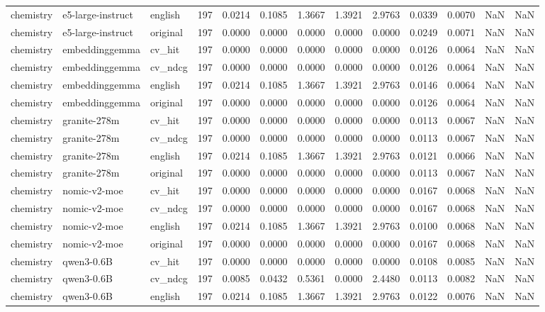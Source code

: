 \begin{tabular}{lllrrrrrrrrrr}
chemistry & e5-large-instruct & english & 197 & 0.0214 & 0.1085 & 1.3667 & 1.3921 & 2.9763 & 0.0339 & 0.0070 & NaN & NaN \\
chemistry & e5-large-instruct & original & 197 & 0.0000 & 0.0000 & 0.0000 & 0.0000 & 0.0000 & 0.0249 & 0.0071 & NaN & NaN \\
chemistry & embeddinggemma & cv\_hit & 197 & 0.0000 & 0.0000 & 0.0000 & 0.0000 & 0.0000 & 0.0126 & 0.0064 & NaN & NaN \\
chemistry & embeddinggemma & cv\_ndcg & 197 & 0.0000 & 0.0000 & 0.0000 & 0.0000 & 0.0000 & 0.0126 & 0.0064 & NaN & NaN \\
chemistry & embeddinggemma & english & 197 & 0.0214 & 0.1085 & 1.3667 & 1.3921 & 2.9763 & 0.0146 & 0.0064 & NaN & NaN \\
chemistry & embeddinggemma & original & 197 & 0.0000 & 0.0000 & 0.0000 & 0.0000 & 0.0000 & 0.0126 & 0.0064 & NaN & NaN \\
chemistry & granite-278m & cv\_hit & 197 & 0.0000 & 0.0000 & 0.0000 & 0.0000 & 0.0000 & 0.0113 & 0.0067 & NaN & NaN \\
chemistry & granite-278m & cv\_ndcg & 197 & 0.0000 & 0.0000 & 0.0000 & 0.0000 & 0.0000 & 0.0113 & 0.0067 & NaN & NaN \\
chemistry & granite-278m & english & 197 & 0.0214 & 0.1085 & 1.3667 & 1.3921 & 2.9763 & 0.0121 & 0.0066 & NaN & NaN \\
chemistry & granite-278m & original & 197 & 0.0000 & 0.0000 & 0.0000 & 0.0000 & 0.0000 & 0.0113 & 0.0067 & NaN & NaN \\
chemistry & nomic-v2-moe & cv\_hit & 197 & 0.0000 & 0.0000 & 0.0000 & 0.0000 & 0.0000 & 0.0167 & 0.0068 & NaN & NaN \\
chemistry & nomic-v2-moe & cv\_ndcg & 197 & 0.0000 & 0.0000 & 0.0000 & 0.0000 & 0.0000 & 0.0167 & 0.0068 & NaN & NaN \\
chemistry & nomic-v2-moe & english & 197 & 0.0214 & 0.1085 & 1.3667 & 1.3921 & 2.9763 & 0.0100 & 0.0068 & NaN & NaN \\
chemistry & nomic-v2-moe & original & 197 & 0.0000 & 0.0000 & 0.0000 & 0.0000 & 0.0000 & 0.0167 & 0.0068 & NaN & NaN \\
chemistry & qwen3-0.6B & cv\_hit & 197 & 0.0000 & 0.0000 & 0.0000 & 0.0000 & 0.0000 & 0.0108 & 0.0085 & NaN & NaN \\
chemistry & qwen3-0.6B & cv\_ndcg & 197 & 0.0085 & 0.0432 & 0.5361 & 0.0000 & 2.4480 & 0.0113 & 0.0082 & NaN & NaN \\
chemistry & qwen3-0.6B & english & 197 & 0.0214 & 0.1085 & 1.3667 & 1.3921 & 2.9763 & 0.0122 & 0.0076 & NaN & NaN \\

\end{tabular}
